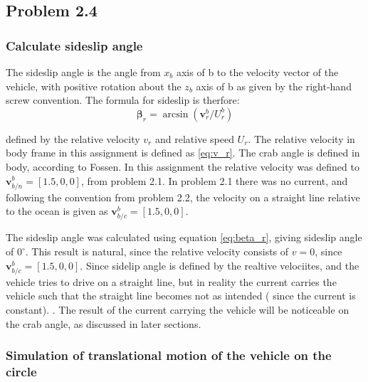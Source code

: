
\subsection*{Problem 2.4}

\subsubsection*{Calculate sideslip angle}

The sideslip angle is the angle from $x_b$ axis of {b} to the velocity vector of the vehicle, with positive rotation about the $z_b$ axis of {b} as given by the right-hand screw convention. The formula for sideslip is therfore:
\begin{equation}
    \boldsymbol{\beta}_r = \arcsin( \mathbf{v}^b_r/U^b_r)
    \label{eq:beta_r}
\end{equation}

defined by the relative velocity $v_r$ and relative speed $U_r$. The relative velocity in body frame in this assignment is defined as \eqref{eq:v_r}. The crab angle is defined in body, according to Fossen. In this assignment the relative velocity was defined to $\mathbf{v}^b_{b/n} = [1.5, 0,0]$, from problem 2.1. In problem 2.1 there was no current, and following the convention from problem 2.2, the velocity on a straight line relative to the ocean is given as $\mathbf{v}^b_{b/c} = [1.5, 0,0]$.  

The sideslip angle was calculated using equation \eqref{eq:beta_r}, giving sideslip angle of $0 ^\circ$. This result is natural, since the relative velocity consists of $v=0$, since  $\mathbf{v}^b_{b/c} = [1.5, 0,0]$. Since sidelip angle is defined by the realtive velociites, and the vehicle tries to drive on a straight line, but in reality the current carries the vehicle such that the straight line becomes not as intended ( since the current is constant). . The result of the current carrying the vehicle will be noticeable on the crab angle, as discussed in later sections. 

\subsubsection{Simulation of translational motion of the vehicle on the circle}

